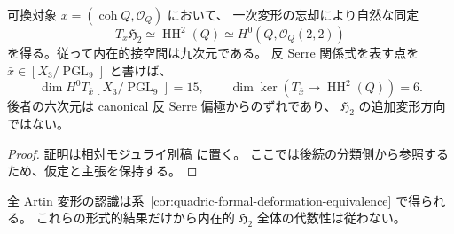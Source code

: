 \begin{corollary}[可換点の内在的な接空間]
\label{cor:quadric-intrinsic-tangent}
可換対象 $x=(\operatorname{coh}Q,\mathcal O_Q)$ において、
一次変形の忘却により自然な同定
\[
 T_x\mathfrak H_2\simeq\operatorname{HH}^2(Q)
      \simeq H^0(Q,\mathcal O_Q(2,2))
\]
を得る。従って内在的接空間は九次元である。
反 Serre 関係式を表す点を $\bar x\in[X_3/\operatorname{PGL}_9]$ と書けば、
\[
 \dim H^0T_{\bar x}[X_3/\operatorname{PGL}_9]=15,
 \qquad \dim\ker(T_{\bar x}\to\operatorname{HH}^2(Q))=6.
\]
後者の六次元は canonical 反 Serre 偏極からのずれであり、
$\mathfrak H_2$ の追加変形方向ではない。
\end{corollary}
\begin{proof}
証明は相対モジュライ別稿 \cite[\texttt{quadric_first_order} 節]{QuadricModuli2026} に置く。
ここでは後続の分類側から参照するため、仮定と主張を保持する。
\end{proof}

全 Artin 変形の認識は系~\ref{cor:quadric-formal-deformation-equivalence} で得られる。
これらの形式的結果だけから内在的 $\mathfrak H_2$ 全体の代数性は従わない。
